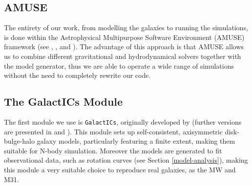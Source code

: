 \documentclass[a4paper,12pt, english]{article}
\begin{document}
\subsection{AMUSE}
\label{amuse}
The entirety of our work, from modelling the galaxies to running the simulations, is done within the Astrophysical Multipurpose Software Environment (AMUSE) framework (see \textcite{Portegies_Zwart_McMillan_2018}, \textcite{Portegies_Zwart_2013}, \textcite{Pelupessy_2013} and \textcite{Portegies_Zwart_2009}). The advantage of this approach is that AMUSE allows us to combine different gravitational and hydrodynamical solvers together with the model generator, thus we are able to operate a wide range of simulations without the need to completely rewrite our code.\par
\smallskip

\subsection{The GalactICs Module}
\label{galactics}
The first module we use is \texttt{GalactICs}, originally developed by \textcite{Kuijken_1995} (further versions are presented in \textcite{Widrow_2005} and \textcite{Widrow_2008}). This module sets up self-consistent, axisymmetric disk-bulge-halo galaxy models, particularly featuring a finite extent, making them suitable for N-body simulation. Moreover the models are generated to fit observational data, such as rotation curves (see Section \ref{model-analysis}), making this module a very suitable choice to reproduce real galaxies, as the MW and M31.\par
\smallskip
\end{document}
